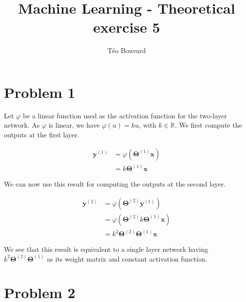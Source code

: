 \documentclass[a4paper, 10pt, twoside]{article}
\begin{document}
\title{Machine Learning - Theoretical exercise 5}
\author{T\'eo Bouvard}
\maketitle

\section*{Problem 1}
Let $\varphi$ be a linear function used as the activation function for the two-layer network. As $\varphi$ is linear, we have $\varphi(u) = ku$, with $k \in \mathbb{R}$.
We first compute the outputs at the first layer.

\begin{align*}
    \bm{y}^{(1)} &= \varphi(\bm{\Theta}^{(1)}\bm{x}) \\
    &= k\bm{\Theta}^{(1)}\bm{x}
\end{align*}

We can now use this result for computing the outputs at the second layer.

\begin{align*}
    \bm{y}^{(2)} &= \varphi(\bm{\Theta}^{(2)}\bm{y}^{(1)}) \\
    &= \varphi(\bm{\Theta}^{(2)}k\bm{\Theta}^{(1)}\bm{x}) \\
    &= k^2\bm{\Theta}^{(2)}\bm{\Theta}^{(1)}\bm{x}
\end{align*}

We see that this result is equivalent to a single layer network having $k^2\bm{\Theta}^{(2)}\bm{\Theta}^{(1)}$ as its weight matrix and constant activation function.

\section*{Problem 2}
\end{document}
